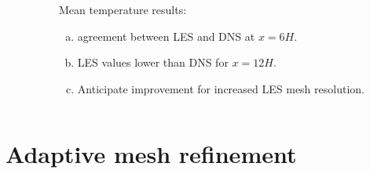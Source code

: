\documentclass{beamer}
\begin{document}
\begin{frame}
\begin{minipage}[0.5\textheight]{\textwidth}
\begin{columns}[T]
\begin{column}{0.7\textwidth}
\end{column}
\hspace{-30pt}
\begin{column}{0.5\textwidth}
\vspace{20pt}
\tiny
Mean temperature results:
\begin{enumerate}[(a)]
\item agreement between LES and DNS at $x = 6H$. 
\item LES values lower than DNS for $x = 12H$. 
\item Anticipate improvement for increased LES mesh resolution.
\end{enumerate}

\end{column}
\end{columns}
\end{minipage}

\end{frame}


\section[AMR]{Adaptive mesh refinement}
\end{document}
